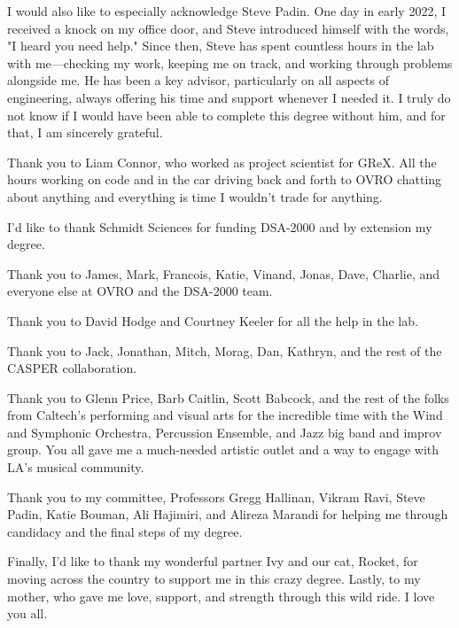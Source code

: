 \begin{acknowledgements}
    I would also like to especially acknowledge Steve Padin.
    One day in early 2022, I received a knock on my office door, and Steve introduced himself with the words, "I heard you need help."
    Since then, Steve has spent countless hours in the lab with me—checking my work, keeping me on track, and working through problems alongside me.
    He has been a key advisor, particularly on all aspects of engineering, always offering his time and support whenever I needed it.
    I truly do not know if I would have been able to complete this degree without him, and for that, I am sincerely grateful.
    
    Thank you to Liam Connor, who worked as project scientist for GReX.
    All the hours working on code and in the car driving back and forth to OVRO chatting about anything and everything is time I wouldn't trade for anything.

    I'd like to thank Schmidt Sciences for funding DSA-2000 and by extension my degree.

    Thank you to James, Mark, Francois, Katie, Vinand, Jonas, Dave, Charlie, and everyone else at OVRO and the DSA-2000 team.

    Thank you to David Hodge and Courtney Keeler for all the help in the lab.

    Thank you to Jack, Jonathan, Mitch, Morag, Dan, Kathryn, and the rest of the CASPER collaboration.

    Thank you to Glenn Price, Barb Caitlin, Scott Babcock, and the rest of the folks from Caltech's performing and visual arts for the incredible time with the Wind and Symphonic Orchestra, Percussion Ensemble, and Jazz big band and improv group.
    You all gave me a much-needed artistic outlet and a way to engage with LA's musical community.

    Thank you to my committee, Professors Gregg Hallinan, Vikram Ravi, Steve Padin, Katie Bouman, Ali Hajimiri, and Alireza Marandi for helping me through candidacy and the final steps of my degree.

    Finally, I'd like to thank my wonderful partner Ivy and our cat, Rocket, for moving across the country to support me in this crazy degree.
    Lastly, to my mother, who gave me love, support, and strength through this wild ride.
    I love you all.
\end{acknowledgements}